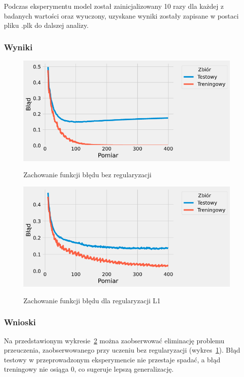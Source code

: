 \documentclass{article}
\begin{document}
Podczas eksperymentu model został zainicjalizowany 10 razy dla każdej z badanych wartości oraz wyuczony, uzyskane wyniki zostały zapisane w postaci pliku .plk do dalszej analizy.

\subsubsection*{Wyniki}
\begin{figure}[H]
	\centering
	\caption{Zachowanie funkcji błędu bez regularyzacji}
	\includegraphics[width=\textwidth]{drop_err_0.png}
	\label{fig:res21}
\end{figure}
\begin{figure}[H]
	\centering
	\caption{Zachowanie funkcji błędu dla regularyzacji L1}
	\includegraphics[width=\textwidth]{reg_err_l1.png}
	\label{fig:res22}
\end{figure}



\subsubsection*{Wnioski}
Na przedstawionym wykresie~\ref{fig:res22} można zaobserwować eliminację problemu przeuczenia, zaobserwowanego przy uczeniu bez regularyzacji (wykres~\ref{fig:res21}). Błąd testowy w przeprowadzonym eksperymencie nie przestaje spadać, a błąd treningowy nie osiąga 0, co sugeruje lepszą generalizację.
\end{document}
